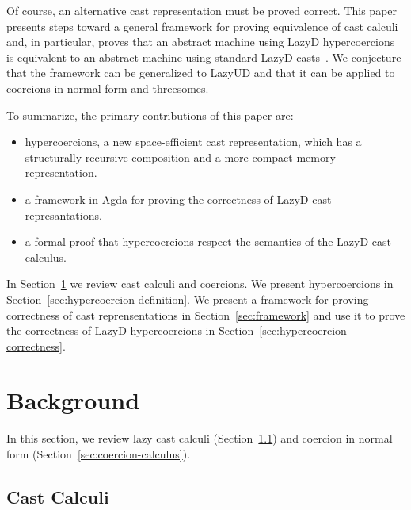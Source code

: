 \documentclass[acmsmall,review,anonymous]{acmart}\settopmatter{printfolios=true,printccs=false,printacmref=false}
\newcommand{\lazyUD}{Lazy\;UD}
\newcommand{\lazyD}{Lazy\;D}
\begin{document}
Of course, an alternative cast representation must be proved
correct. This paper presents steps toward a general framework for
proving equivalence of cast calculi and, in particular, proves that an
abstract machine using \lazyD{} hypercoercions is equivalent to an
abstract machine using standard \lazyD{}
casts~\citep{siek2009exploring}. We conjecture that the framework can
be generalized to \lazyUD{} and that it can be applied to coercions in
normal form and threesomes.

To summarize, the primary contributions of this paper are:
\begin{itemize}
\item hypercoercions, a new space-efficient cast representation, which
  has a structurally recursive composition and a more compact memory
  representation.
\item a framework in Agda for proving the correctness of \lazyD{} cast
  represantations.
\item a formal proof that hypercoercions respect the semantics
  of the \lazyD{} cast calculus.
\end{itemize}

In Section~\ref{sec:background} we review cast calculi and coercions.
We present hypercoercions in
Section~\ref{sec:hypercoercion-definition}.  We present a framework
for proving correctness of cast reprensentations in
Section~\ref{sec:framework} and use it to prove the correctness of
\lazyD{} hypercoercions in
Section~\ref{sec:hypercoercion-correctness}.

\section{Background} \label{sec:background}

In this section, we review lazy cast calculi
(Section~\ref{sec:cast-calculi}) and coercion in normal form
(Section~\ref{sec:coercion-calculus}).

\subsection{Cast Calculi}
\label{sec:cast-calculi}
\end{document}
